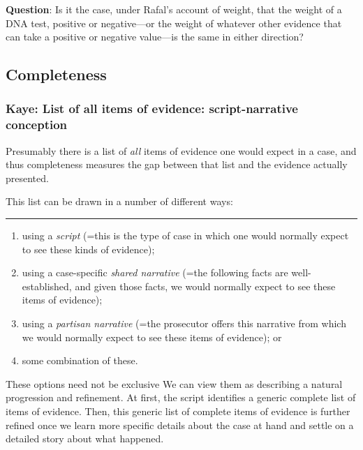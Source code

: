 \documentclass[
  10pt,
  dvipsnames,enabledeprecatedfontcommands]{scrartcl}
\begin{document}
\textbf{Question}: Is it the case, under Rafal's account of weight, that
the weight of a DNA test, positive or negative---or the weight of
whatever other evidence that can take a positive or negative value---is
the same in either direction?

\hypertarget{completeness}{%
\subsection{Completeness}\label{completeness}}

\hypertarget{kaye-list-of-all-items-of-evidence-script-narrative-conception}{%
\subsubsection{Kaye: List of all items of evidence: script-narrative
conception}\label{kaye-list-of-all-items-of-evidence-script-narrative-conception}}

Presumably there is a list of \emph{all} items of evidence one would
expect in a case, and thus completeness measures the gap between that
list and the evidence actually presented.

This list can be drawn in a number of different ways:

\begin{center}\rule{0.5\linewidth}{0.5pt}\end{center}

\begin{enumerate}
\def\labelenumi{(\alph{enumi})}
\item
  using a \emph{script} (=this is the type of case in which one would
  normally expect to see these kinds of evidence);
\item
  using a case-specific \emph{shared narrative} (=the following facts
  are well-established, and given those facts, we would normally expect
  to see these items of evidence);
\item
  using a \emph{partisan narrative} (=the prosecutor offers this
  narrative from which we would normally expect to see these items of
  evidence); or
\item
  some combination of these.
\end{enumerate}

These options need not be exclusive We can view them as describing a
natural progression and refinement. At first, the script identifies a
generic complete list of items of evidence. Then, this generic list of
complete items of evidence is further refined once we learn more
specific details about the case at hand and settle on a detailed story
about what happened.
\end{document}
